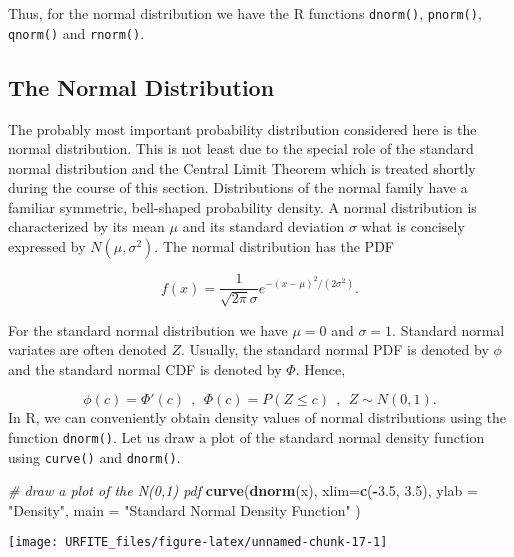 \documentclass[]{book}
\newenvironment{Shaded}{\begin{snugshade}}{\end{snugshade}}
\newcommand{\KeywordTok}[1]{\textcolor[rgb]{0.13,0.29,0.53}{\textbf{#1}}}
\newcommand{\DataTypeTok}[1]{\textcolor[rgb]{0.13,0.29,0.53}{#1}}
\newcommand{\FloatTok}[1]{\textcolor[rgb]{0.00,0.00,0.81}{#1}}
\newcommand{\StringTok}[1]{\textcolor[rgb]{0.31,0.60,0.02}{#1}}
\newcommand{\CommentTok}[1]{\textcolor[rgb]{0.56,0.35,0.01}{\textit{#1}}}
\newcommand{\OperatorTok}[1]{\textcolor[rgb]{0.81,0.36,0.00}{\textbf{#1}}}
\newcommand{\NormalTok}[1]{#1}
\theoremstyle{definition}
\theoremstyle{definition}
\theoremstyle{definition}
\theoremstyle{remark}
\begin{document}
Thus, for the normal distribution we have the R functions
\texttt{dnorm()}, \texttt{pnorm()}, \texttt{qnorm()} and
\texttt{rnorm()}.

\subsection*{The Normal Distribution}\label{the-normal-distribution}

The probably most important probability distribution considered here is
the normal distribution. This is not least due to the special role of
the standard normal distribution and the Central Limit Theorem which is
treated shortly during the course of this section. Distributions of the
normal family have a familiar symmetric, bell-shaped probability
density. A normal distribution is characterized by its mean \(\mu\) and
its standard deviation \(\sigma\) what is concisely expressed by
\(N(\mu,\sigma^2)\). The normal distribution has the PDF

\[ f(x) = \frac{1}{\sqrt{2 \pi} \sigma} e^{-(x - μ)^2/(2 σ^2)}. \]

For the standard normal distribution we have \(\mu=0\) and \(\sigma=1\).
Standard normal variates are often denoted \(Z\). Usually, the standard
normal PDF is denoted by \(\phi\) and the standard normal CDF is denoted
by \(\Phi\). Hence,

\[ \phi(c) = \Phi'(c) \ \ , \ \ \Phi(c) = P(Z \leq c) \ \ , \ \ Z \sim N(0,1).
\] In R, we can conveniently obtain density values of normal
distributions using the function \texttt{dnorm()}. Let us draw a plot of
the standard normal density function using \texttt{curve()} and
\texttt{dnorm()}.

\begin{Shaded}
\begin{Highlighting}[]
\CommentTok{# draw a plot of the N(0,1) pdf}
\KeywordTok{curve}\NormalTok{(}\KeywordTok{dnorm}\NormalTok{(x),}
      \DataTypeTok{xlim=}\KeywordTok{c}\NormalTok{(}\OperatorTok{-}\FloatTok{3.5}\NormalTok{, }\FloatTok{3.5}\NormalTok{),}
      \DataTypeTok{ylab =} \StringTok{"Density"}\NormalTok{, }
      \DataTypeTok{main =} \StringTok{"Standard Normal Density Function"}
\NormalTok{      ) }
\end{Highlighting}
\end{Shaded}

\begin{center}\texttt{[image: URFITE\_files/figure-latex/unnamed-chunk-17-1]} \end{center}
\end{document}
